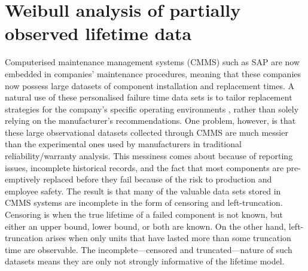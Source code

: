\chapter{Weibull analysis of partially observed lifetime data} \label{chap:chapter2}

Computerised maintenance management systems (CMMS) such as SAP \citep{sap} are now embedded in companies' maintenance procedures, meaning that these companies now possess large datasets of component installation and replacement times. A natural use of these personalised failure time data sets is to tailor replacement strategies for the company's specific operating environments \citep[p. 13]{Meeker2022}, rather than solely relying on the manufacturer's recommendations. One problem, however, is that these large observational datasets collected through CMMS are much messier than the experimental ones used by manufacturers in traditional reliability/warranty analysis. This messiness comes about because of reporting issues, incomplete historical records, and the fact that most components are pre-emptively replaced before they fail because of the risk to production and employee safety. The result is that many of the valuable data sets stored in CMMS systems are incomplete in the form of censoring and left-truncation. Censoring is when the true lifetime of a failed component is not known, but either an upper bound, lower bound, or both are known. On the other hand, left-truncation arises when only units that have lasted more than some truncation time are observable. The incomplete---censored and truncated---nature of such datasets means they are only not strongly informative of the lifetime model.

